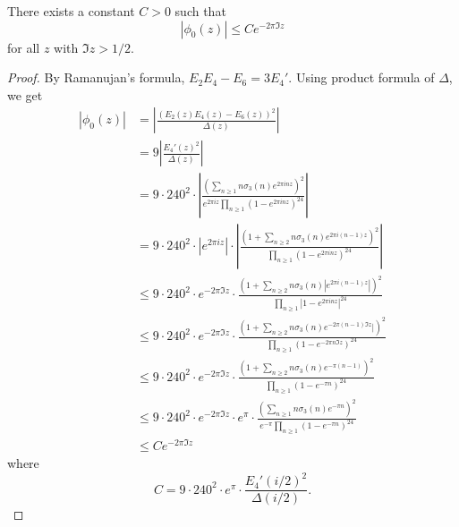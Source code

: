 \begin{lemma}\label{lemma:phi0-bound}
There exists a constant $C > 0$ such that
\begin{equation}\label{eqn:phi0-bound}
|\phi_0(z)| \le C e^{-2 \pi \Im z}
\end{equation}
for all $z$ with $\Im z > 1/2$.
\end{lemma}
\begin{proof}
By Ramanujan's formula, $E_2 E_4 - E_6 = 3E_4'$.
Using product formula of $\Delta$, we get
\begin{align}
    |\phi_0(z)| &= \left|\frac{(E_2(z) E_4(z) - E_6(z))^2}{\Delta(z)}\right| \\
    &= 9\left|\frac{E_4'(z)^2}{\Delta(z)}\right| \\
    &= 9 \cdot 240^2 \cdot \left|\frac{\left(\sum_{n \ge 1} n \sigma_3(n) e^{2 \pi i n z}\right)^{2}}{e^{2\pi i z} \prod_{n \ge 1} (1 - e^{2\pi i n z})^{24}}\right| \\
    &= 9 \cdot 240^2 \cdot \left|e^{2 \pi i z}\right| \cdot \left|\frac{\left(1 + \sum_{n\ge 2} n\sigma_3(n) e^{2 \pi i (n - 1) z} \right)^{2}}{\prod_{n \ge 1}(1 - e^{2 \pi i n z})^{24}}\right| \\
    &\le 9 \cdot 240^2 \cdot e^{-2 \pi \Im z} \cdot \frac{\left(1 + \sum_{n \ge 2} n \sigma_3(n) |e^{2 \pi i (n-1)z}|\right)^{2}}{\prod_{n \ge 1}|1 - e^{2 \pi i n z}|^{24}} \\
    &\le 9 \cdot 240^2 \cdot e^{-2 \pi \Im z} \cdot \frac{\left(1 + \sum_{n \ge 2} n \sigma_3(n) e^{-2 \pi (n-1) \Im z}|\right)^{2}}{\prod_{n \ge 1}(1 - e^{-2 \pi n \Im z})^{24}} \\
    &\le 9 \cdot 240^2 \cdot e^{-2 \pi \Im z} \cdot \frac{\left(1 + \sum_{n \ge 2} n \sigma_3(n) e^{-\pi(n-1)}\right)^{2}}{\prod_{n \ge 1}(1 - e^{-\pi n})^{24}} \\
    &\le 9 \cdot 240^2 \cdot e^{-2 \pi \Im z} \cdot e^{\pi} \cdot \frac{\left(\sum_{n \ge 1} n \sigma_3(n) e^{-\pi n}\right)^{2}}{e^{-\pi}\prod_{n \ge 1}(1 - e^{-\pi n})^{24}} \\
    &\le C e^{-2 \pi \Im z}
\end{align}
where
\begin{equation}
    C = 9 \cdot 240^2 \cdot e^{\pi} \cdot \frac{E_4'(i/2)^{2}}{\Delta(i/2)}.
\end{equation}
\end{proof}

